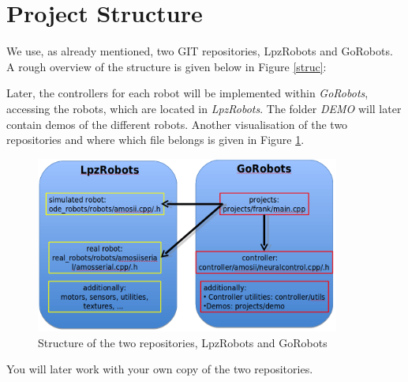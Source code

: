 \section{Project Structure}

We use, as already mentioned, two GIT repositories, LpzRobots and GoRobots. A rough overview of the structure is given below in Figure \ref{struc}:


Later, the controllers for each robot will be implemented within \emph{GoRobots}, accessing the robots, which are located in \emph{LpzRobots}. The folder \emph{DEMO} will later contain demos of the different robots.
Another visualisation of the two repositories and where which file belongs is given in Figure \ref{struc2}.
\begin{figure}[h!]
 \begin{center}
  \includegraphics[width=10cm]{./pics/struct.png}
 \end{center}
\caption{Structure of the two repositories, LpzRobots and GoRobots}
\label{struc2}
\end{figure}

You will later work with your own copy of the two repositories.

\newpage

%  

